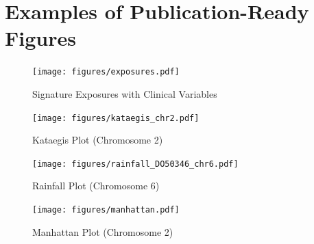 \documentclass[12pt, letterpaper]{article}
\begin{document}
\pagebreak
\appendix                                     
\section{Examples of Publication-Ready Figures}
\renewcommand{\figurename}{Example Figure}
\setcounter{figure}{0}

\begin{figure}[h!]
    \caption{Signature Exposures with Clinical Variables}
    \centering
    \texttt{[image: figures/exposures.pdf]}
\end{figure}
\begin{figure}[h!]
    \caption{Kataegis Plot (Chromosome 2)}
    \centering
    \texttt{[image: figures/kataegis\_chr2.pdf]}
\end{figure}
\begin{figure}[h!]
    \caption{Rainfall Plot (Chromosome 6)}
    \centering
    \texttt{[image: figures/rainfall\_DO50346\_chr6.pdf]}
\end{figure}
\begin{figure}[h!]
    \caption{Manhattan Plot (Chromosome 2)}
    \centering
    \texttt{[image: figures/manhattan.pdf]}
\end{figure}
\end{document}
